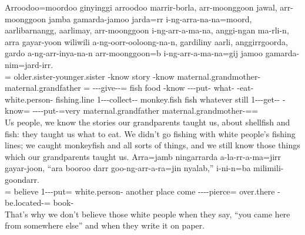 \begin{exye}
\exy {}
\gll Arroodoo=moordoo ginyinggi arroodoo marrir-borla, arr-moonggoon jawal, arr-moonggoon jamba gamarda-jamoo jarda=rr i-ng-arra-na-na=moord, aarlibarnangg, aarlimay, arr-moonggoon i-ng-arr-a-ma-na, anggi-ngan ma-rli-n, arra  gayar-yoon wiliwili a-ng-oorr-ooloong-na-n, gardiliny aarli, anggirrgoorda, gardo a-ng-arr-inya-na-n arr-moonggoon=b i-ng-arr-a-ma-na=gij jamoo gamarda-nim=jard-irr.\\
=   older.sister-younger.sister -know story -know  maternal.grandmother-maternal.grandfather = ---give--= fish food -know ---put- what- -eat- 
white.person- fishing.line 1---collect-- monkey.fish fish whatever still 1---get-- -know= ----put-=very maternal.grandfather maternal.grandmother-==\\
\ft Us people, we know the stories our grandparents taught us, about shellfish and fish: they taught us what to eat. We didn't go fishing with white people's fishing lines; we caught monkeyfish and all sorts of things, and we still know those things which our grandparents taught us.
\exy {}
\gll Arra=jamb ningarrarda a-la-rr-a-ma=jirr gayar-joon, ``ara booroo darr goo-ng-arr-a-ra=jin nyalab,'' i-ni-n=ba milimili-goondarr.\\
= believe 1---put= white.person- another place come ----pierce= over.there -be.located-= book-\\
\ft That's why we don't believe those white people when they say, ``you came here from somewhere else'' and when they write it on paper.

\end{exye}
